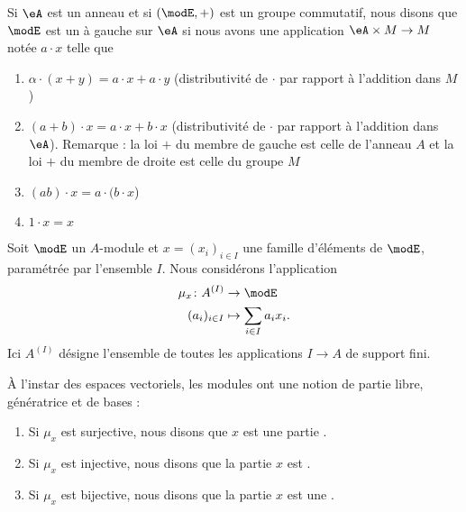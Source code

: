 Si \( \eA\) est un anneau et si \( (\modE,+)\) est un groupe commutatif, nous disons que \( \modE\) est un  à gauche sur \( \eA\) si nous avons une application \( \eA\times M\to M\) notée \( a\cdot x\) telle que
\begin{enumerate}
    \item
       $\alpha\cdot(x + y) = a\cdot x + a\cdot y$  (distributivité de $\cdot$ par rapport à l'addition dans $M$)
   \item $(a + b) \cdot x = a \cdot x + b \cdot x$ (distributivité de $\cdot$ par rapport à l'addition dans \( \eA\)). Remarque :  la loi $+$ du membre de gauche est celle de l'anneau $A$ et la loi $+$ du membre de droite est celle du groupe $M$
   \item $(ab) \cdot x = a \cdot (b \cdot x$)
   \item $1 \cdot x = x$ 
\end{enumerate}

Soit \( \modE\) un \( A\)-module et \( x=(x_i)_{i\in I}\) une famille d'éléments de \( \modE\), paramétrée par l'ensemble \( I\). Nous considérons l'application
\begin{equation}
    \begin{aligned}
        \mu_x\colon A^{(I)}&\to \modE \\
        (a_i)_{i\in I}&\mapsto \sum_{i\in I}a_ix_i.
    \end{aligned}
\end{equation}
Ici \( A^{(I)}\) désigne l'ensemble de toutes les applications \( I\to A\) de support fini.  

\begin{definition}      \label{DefBasePouyKj}
    À l'instar des espaces vectoriels, les modules ont une notion de partie libre, génératrice et de bases :
    \begin{enumerate}
        \item
            Si \( \mu_x\) est surjective, nous disons que \( x\) est une partie .
        \item
            Si \( \mu_x\) est injective, nous disons que la partie \( x\) est .
        \item
            Si \( \mu_x\) est bijective, nous disons que la partie \( x\) est une .
    \end{enumerate}
\end{definition}

